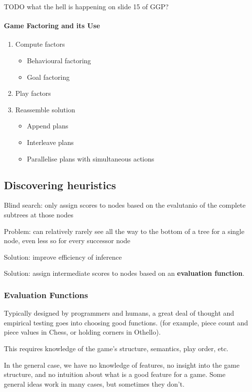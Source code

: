 TODO what the hell is happening on slide 15 of GGP?

\paragraph{Game Factoring and its Use}
\begin{enumerate}
    \item Compute factors
        \begin{itemize}
            \item Behavioural factoring
            \item Goal factoring
        \end{itemize}
    \item Play factors
    \item Reassemble solution
        \begin{itemize}
            \item Append plans
            \item Interleave plans
            \item Parallelise plans with simultaneous actions
        \end{itemize}
\end{enumerate}

\subsection{Discovering heuristics}
Blind search: only assign scores to nodes based on the evalutanio of the
complete subtrees at those nodes

Problem: can relatively rarely see all the way to the bottom of a tree for a
single node, even less so for every successor node

Solution: improve efficiency of inference

Solution: assign intermediate scores to nodes based on an \textbf{evaluation
function}.

\subsubsection{Evaluation Functions}
Typically designed by programmers and humans, a great deal of thought and
empirical testing goes into choosing good functions. (for example, piece count
and piece values in Chess, or holding corners in Othello).

This requires knowledge of the game's structure, semantics, play order, etc.

In the general case, we have no knowledge of features, no insight into the game
structure, and no intuition about what is a good feature for a game. Some
general ideas work in many cases, but sometimes they don't.

